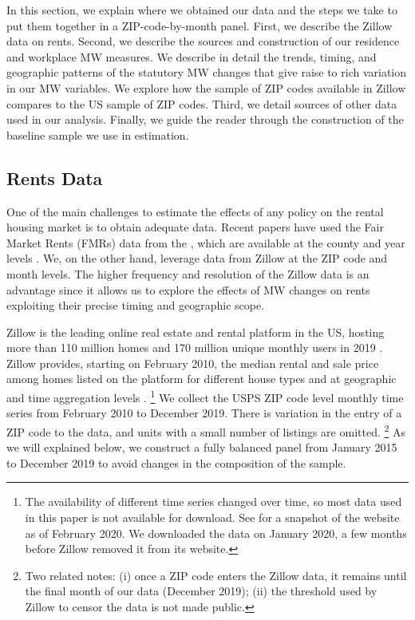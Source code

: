 
In this section, we explain where we obtained our data and the steps we take to 
put them together in a ZIP-code-by-month panel.
First, we describe the Zillow data on rents.
Second, we describe the sources and construction of our residence and workplace 
MW measures.
We describe in detail the trends, timing, and geographic patterns of the 
statutory MW changes that give raise to rich variation in our MW variables.
We explore how the sample of ZIP codes available in Zillow compares to the US 
sample of ZIP codes.
Third, we detail sources of other data used in our analysis.
Finally, we guide the reader through the construction of the baseline sample we
use in estimation.

\subsection{Rents Data}

One of the main challenges to estimate the effects of any policy on the rental
housing market is to obtain adequate data.
Recent papers have used the Fair Market Rents (FMRs) data from the 
\citeauthor{hudSAFMR}, which are available at the county and year levels 
\parencite{Tidemann2018, Yamagishi2019}.
We, on the other hand, leverage data from Zillow at the ZIP code and month 
levels.
The higher frequency and resolution of the Zillow data is an advantage since it 
allows us to explore the effects of MW changes on rents exploiting their precise
timing and geographic scope. 

Zillow is the leading online real estate and rental platform in the US, hosting
more than 110 million homes and 170 million unique monthly users in 2019 
\parencite{ZillowFacts}.
Zillow provides, starting on February 2010, the median rental and sale price among 
homes listed on the platform for different house types and at geographic and 
time aggregation levels \parencite{ZillowData}.%
\footnote{The availability of different time series changed over time, so most
data used in this paper is not available for download.
See \textcite{ZillowDataArchive} for a snapshot of the website as of 
February 2020.
We downloaded the data on January 2020, a few months before Zillow removed it 
from its website.} 
We collect the USPS ZIP code level monthly time series from February 2010 to December 2019. 
There is variation in the entry of a ZIP code to the data, and units with a small 
number of listings are omitted.%
\footnote{Two related notes:
(i) once a ZIP code enters the Zillow data, it remains until the final month 
of our data (December 2019);
(ii) the threshold used by Zillow to censor the data is not made public.}
As we will explained below, we construct a fully balanced panel from January 2015 
to December 2019 to avoid changes in the composition of the sample.

